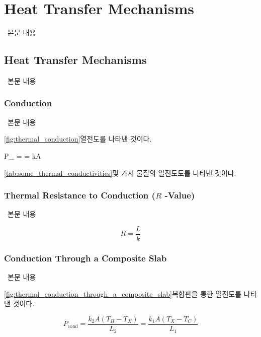 \section{Heat Transfer Mechanisms}
%
\ 본문 내용

\subsection{Heat Transfer Mechanisms}
%
\ 본문 내용

\subsubsection{Conduction}
%
\ 본문 내용

\thermalconduction
\autoref{fig:thermal_conduction}\은 열전도를 나타낸 것이다.

\begin{eqbox} P_{} =  = kA 
\label{eq:conduction_rate} \end{eqbox}

\somethermalconductivities
\autoref{tab:some_thermal_conductivities}\은 몇 가지 물질의 열전도도를 나타낸 것이다.

\subsubsection{Thermal Resistance to Conduction (\(R\) -Value)}
%
\ 본문 내용

\begin{equation} R = \frac{L}{k} \end{equation}

\subsubsection{Conduction Through a Composite Slab}
%
\ 본문 내용

\thermalconductionthroughacompositeslab
\autoref{fig:thermal_conduction_through_a_composite_slab}\은 복합판을 통한 열전도를 나타낸 것이다.

\begin{equation} P_{\text{cond}} = \frac{k_2 A (T_H - T_X)}{L_2} = \frac{k_1 A (T_X - T_C)}{L_1} \end{equation}

